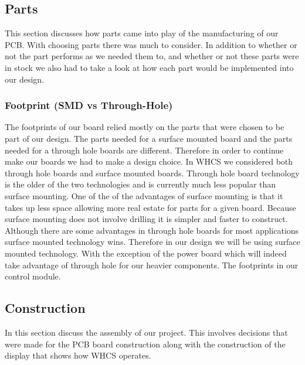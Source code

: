 \subsection{Parts}
This section discusses how parts came into play of the manufacturing of
our PCB. With choosing parts there was much to consider. In addition to whether or not
the part performs as we needed them to, and whether or not these parts were
in stock we also had to take a look at how each part would be
implemented into our design.

\subsubsection{Footprint (SMD vs Through-Hole)}
The footprints of our board relied mostly on the parts that were chosen to
be part of our design. The parts needed for a surface mounted board and the
parts needed for a through hole boards are different. Therefore in order to
continue make our boards we had to make a design choice. In WHCS we considered
both through hole boards and surface mounted boards. Through hole board
technology is the older of the two technologies and is currently much less
popular than surface mounting. One of the of the advantages of surface mounting
is that it takes up less space allowing more real estate for parts for a given
board. Because surface mounting does not involve drilling it is simpler and
faster to construct. Although there are some advantages in through hole boards
for most applications surface mounted technology wins. Therefore in our design
we will be using surface mounted technology. With the exception of the power
board which will indeed take advantage of through hole for our heavier components. The footprints in our control module.

\subsection{Construction}
In this section discuss the assembly of our project. This
involves decisions that were made for the PCB board construction 
along with the construction of the display that shows how WHCS
operates.

